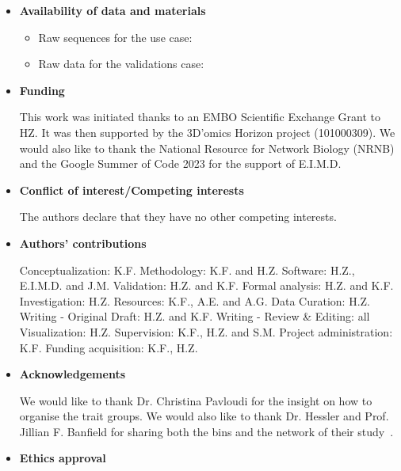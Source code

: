 \documentclass[sn-mathphys,Numbered]{sn-jnl}  %
\theoremstyle{thmstyleone}%
\theoremstyle{thmstyletwo}%
\theoremstyle{thmstylethree}%
\begin{document}
    \begin{itemize}

        \item \textbf{Availability of data and materials}

            \begin{itemize}
                \item Raw sequences for the use case: 
                \item Raw data for the validations case:
            \end{itemize}

        \item \textbf{Funding}
        
            This work was initiated thanks to an EMBO Scientific Exchange Grant to HZ. 
            It was then supported by the 3D’omics Horizon project (101000309). 
            We would also like to thank the National Resource for Network Biology (NRNB) and the Google Summer of Code 2023 for the support of E.I.M.D.

        \item \textbf{Conflict of interest/Competing interests} 

            The authors declare that they have no other competing interests.

        \item \textbf{Authors' contributions}

            Conceptualization: K.F.
            Methodology: K.F. and H.Z.
            Software: H.Z., E.I.M.D. and J.M.
            Validation: H.Z. and K.F.
            Formal analysis: H.Z. and K.F.
            Investigation: H.Z.
            Resources: K.F., A.E. and A.G.
            Data Curation: H.Z.
            Writing - Original Draft: H.Z. and K.F. 
            Writing - Review \& Editing: all
            Visualization: H.Z.
            Supervision: K.F., H.Z. and S.M.
            Project administration: K.F.
            Funding acquisition: K.F., H.Z.


        \item \textbf{Acknowledgements}

            We would like to thank Dr. Christina Pavloudi for the insight on how to organise the trait groups.
            We would also like to thank Dr. Hessler and Prof. Jillian F. Banfield for sharing both the bins and the network of their study~\cite{hessler2023vitamin}. 


        \item \textbf{Ethics approval}


\end{itemize}
\end{document}
